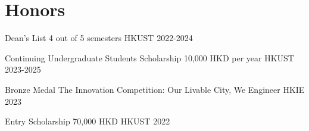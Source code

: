 \section{Honors}
\begin{cvhonors}

\cvhonor
{Dean's List} %
{4 out of 5 semesters} %
{HKUST} %
{2022-2024} %

\cvhonor
{Continuing Undergraduate Students Scholarship} %
{10,000 HKD per year} %
{HKUST} %
{2023-2025} %

\cvhonor
{Bronze Medal} %
{The Innovation Competition: Our Livable City, We Engineer } %
{HKIE} %
{2023} %

\cvhonor
{Entry Scholarship} %
{70,000 HKD} %
{HKUST} %
{2022} %

\end{cvhonors}